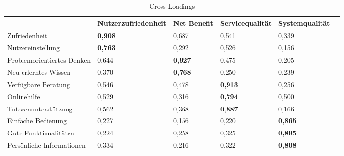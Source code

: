 \begin{table}[h] 
\footnotesize
\caption{Cross Loadings}
\label{tab:Cross-Loadings} 
\begin{tabular}{@{}llllll@{}} \toprule

 & \textbf{Nutzerzufriedenheit} & \textbf{Net Benefit} & \textbf{Servicequalität} & \textbf{Systemqualität} \\ \midrule

Zufriedenheit 				& \textbf{0,908}		& 0,687 	& 0,541	& 0,339		\\

Nutzereinstellung				& \textbf{0,763}		& 0,292 	& 0,526	& 0,156\\
Problemorientiertes Denken 		& 0,644 		& \textbf{0,927}	& 0,475	& 0,205	\\

Neu erlerntes Wissen			& 0,370 		& \textbf{0,768}	& 0,250 	& 0,239	\\ 

 
Verfügbare Beratung		& 0,546 		& 0,478 	&\textbf{0,913}	& 0,256		\\

 
Onlinehilfe 			& 0,529 		& 0,316	& \textbf{0,794}	& 0,500 		\\

Tutorenunterstützung	& 0,562 		& 0,368 	& \textbf{0,887}	& 0,166		\\ 


Einfache Bedienung		& 0,227 		& 0,156 	& 0,220	& \textbf{0,865}	\\ 

Gute Funktionalitäten 	& 0,224 		& 0,258	& 0,325	& \textbf{0,895} 		\\ 
 
Persönliche Informationen 	& 0,334 		& 0,216 	& 0,322	& \textbf{0,808}	\\	
		 
 \bottomrule
 
\end{tabular}	
\end{table}










